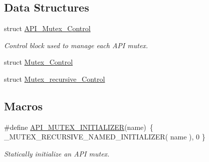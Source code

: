 \subsection*{Data Structures}
\begin{DoxyCompactItemize}
\item 
struct \mbox{\hyperlink{structAPI__Mutex__Control}{A\+P\+I\+\_\+\+Mutex\+\_\+\+Control}}
\begin{DoxyCompactList}\small\item\em Control block used to manage each A\+PI mutex. \end{DoxyCompactList}\item 
struct \mbox{\hyperlink{structMutex__Control}{Mutex\+\_\+\+Control}}
\item 
struct \mbox{\hyperlink{structMutex__recursive__Control}{Mutex\+\_\+recursive\+\_\+\+Control}}
\end{DoxyCompactItemize}
\subsection*{Macros}
\begin{DoxyCompactItemize}
\item 
\mbox{\label{group__RTEMSScoreAPIMutex_ga910dd97f4dc9e1aebaef691d64b81be4}} 
\#define \mbox{\hyperlink{group__RTEMSScoreAPIMutex_ga910dd97f4dc9e1aebaef691d64b81be4}{A\+P\+I\+\_\+\+M\+U\+T\+E\+X\+\_\+\+I\+N\+I\+T\+I\+A\+L\+I\+Z\+ER}}(name)~\{ \+\_\+\+M\+U\+T\+E\+X\+\_\+\+R\+E\+C\+U\+R\+S\+I\+V\+E\+\_\+\+N\+A\+M\+E\+D\+\_\+\+I\+N\+I\+T\+I\+A\+L\+I\+Z\+ER( name ), 0 \}
\begin{DoxyCompactList}\small\item\em Statically initialize an A\+PI mutex. \end{DoxyCompactList}\end{DoxyCompactItemize}
